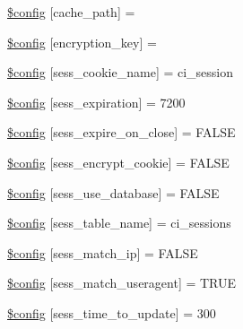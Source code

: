 \begin{DoxyCompactItemize}
\item 
\hyperlink{ci_2application_2config_2config_8php_ae3a5dd52b4d040adb6461b9a17d1e0f0}{\$config} \mbox{[}\textquotesingle{}cache\+\_\+path\textquotesingle{}\mbox{]} = \textquotesingle{}\textquotesingle{}
\item 
\hyperlink{ci_2application_2config_2config_8php_aefa5c9d6e7a454a6218df87e65796357}{\$config} \mbox{[}\textquotesingle{}encryption\+\_\+key\textquotesingle{}\mbox{]} = \textquotesingle{}\textquotesingle{}
\item 
\hyperlink{ci_2application_2config_2config_8php_acaf9fb6347a03527f4b04198d6d8155b}{\$config} \mbox{[}\textquotesingle{}sess\+\_\+cookie\+\_\+name\textquotesingle{}\mbox{]} = \textquotesingle{}ci\+\_\+session\textquotesingle{}
\item 
\hyperlink{ci_2application_2config_2config_8php_ad6a3784cad81991936465dcdac74b66a}{\$config} \mbox{[}\textquotesingle{}sess\+\_\+expiration\textquotesingle{}\mbox{]} = 7200
\item 
\hyperlink{ci_2application_2config_2config_8php_afe76a77df2001e739290d58bf6029036}{\$config} \mbox{[}\textquotesingle{}sess\+\_\+expire\+\_\+on\+\_\+close\textquotesingle{}\mbox{]} = F\+A\+L\+SE
\item 
\hyperlink{ci_2application_2config_2config_8php_aed8943fa55fc74e62b540e8638c03038}{\$config} \mbox{[}\textquotesingle{}sess\+\_\+encrypt\+\_\+cookie\textquotesingle{}\mbox{]} = F\+A\+L\+SE
\item 
\hyperlink{ci_2application_2config_2config_8php_ae320549e749a21903b685e363820370a}{\$config} \mbox{[}\textquotesingle{}sess\+\_\+use\+\_\+database\textquotesingle{}\mbox{]} = F\+A\+L\+SE
\item 
\hyperlink{ci_2application_2config_2config_8php_ab65a6c6a4a0f2339707a4c20c44bf16b}{\$config} \mbox{[}\textquotesingle{}sess\+\_\+table\+\_\+name\textquotesingle{}\mbox{]} = \textquotesingle{}ci\+\_\+sessions\textquotesingle{}
\item 
\hyperlink{ci_2application_2config_2config_8php_aed449d12f2854249e5f7229fafb269b2}{\$config} \mbox{[}\textquotesingle{}sess\+\_\+match\+\_\+ip\textquotesingle{}\mbox{]} = F\+A\+L\+SE
\item 
\hyperlink{ci_2application_2config_2config_8php_a90a66e41bce1a62ff818c4f0e3aa09d2}{\$config} \mbox{[}\textquotesingle{}sess\+\_\+match\+\_\+useragent\textquotesingle{}\mbox{]} = T\+R\+UE
\item 
\hyperlink{ci_2application_2config_2config_8php_afb6a66c470a9c08b90efcbc6c5594573}{\$config} \mbox{[}\textquotesingle{}sess\+\_\+time\+\_\+to\+\_\+update\textquotesingle{}\mbox{]} = 300

\end{DoxyCompactItemize}
